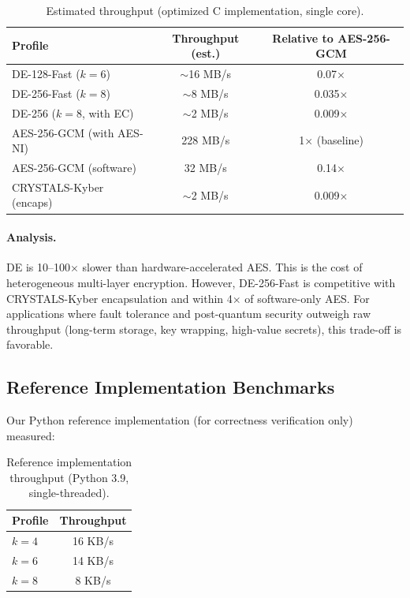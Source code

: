 \documentclass[11pt]{article}
\newcommand{\DE}{\textsf{DE}}
\begin{document}
\begin{table}[h]
\centering
\caption{Estimated throughput (optimized C implementation, single core).}
\label{tab:perf-theory}
\begin{tabular}{@{}lcc@{}}
\toprule
Profile & Throughput (est.) & Relative to AES-256-GCM \\
\midrule
DE-128-Fast ($k=6$) & $\sim$16 MB/s & 0.07$\times$ \\
DE-256-Fast ($k=8$) & $\sim$8 MB/s & 0.035$\times$ \\
DE-256 ($k=8$, with EC) & $\sim$2 MB/s & 0.009$\times$ \\
\midrule
AES-256-GCM (with AES-NI) & 228 MB/s & 1$\times$ (baseline) \\
AES-256-GCM (software) & 32 MB/s & 0.14$\times$ \\
CRYSTALS-Kyber (encaps) & $\sim$2 MB/s & 0.009$\times$ \\
\bottomrule
\end{tabular}
\end{table}

\paragraph{Analysis.}
\DE{} is 10--100$\times$ slower than hardware-accelerated AES. This is the
cost of heterogeneous multi-layer encryption. However, DE-256-Fast is
competitive with CRYSTALS-Kyber encapsulation and within 4$\times$ of
software-only AES. For applications where fault tolerance and post-quantum
security outweigh raw throughput (long-term storage, key wrapping,
high-value secrets), this trade-off is favorable.

\subsection{Reference Implementation Benchmarks}

Our Python reference implementation (for correctness verification only)
measured:

\begin{table}[h]
\centering
\caption{Reference implementation throughput (Python 3.9, single-threaded).}
\label{tab:perf-ref}
\begin{tabular}{@{}lc@{}}
\toprule
Profile & Throughput \\
\midrule
$k=4$ & 16 KB/s \\
$k=6$ & 14 KB/s \\
$k=8$ & 8 KB/s \\
\bottomrule
\end{tabular}
\end{table}
\end{document}
